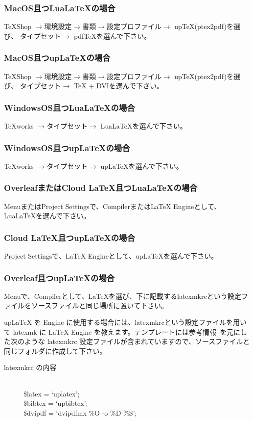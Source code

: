 \documentclass{PASJ2026}
\begin{document}
\subsubsection{MacOS且つLuaLaTeXの場合}
TeXShop $\rightarrow$環境設定$\rightarrow$書類$\rightarrow$設定プロファイル$\rightarrow$ upTeX(ptex2pdf)を選び、
タイプセット$\rightarrow$ pdfTeXを選んで下さい。
\subsubsection{MacOS且つupLaTeXの場合}
TeXShop $\rightarrow$環境設定$\rightarrow$書類$\rightarrow$設定プロファイル$\rightarrow$ upTeX(ptex2pdf)を選び、
タイプセット$\rightarrow$ TeX + DVIを選んで下さい。
\subsubsection{WindowsOS且つLuaLaTeXの場合}
TeXworks $\rightarrow$タイプセット$\rightarrow$ LuaLaTeXを選んで下さい。
\subsubsection{WindowsOS且つupLaTeXの場合}
TeXworks $\rightarrow$タイプセット$\rightarrow$ upLaTeXを選んで下さい。
%
\subsubsection{OverleafまたはCloud LaTeX且つLuaLaTeXの場合}
MenuまたはProject Settingsで、CompilerまたはLaTeX Engineとして、LuaLaTeXを選んで下さい。\\
%
\subsubsection{Cloud LaTeX且つupLaTeXの場合}
Project Settingsで、LaTeX Engineとして、upLaTeXを選んで下さい。
\subsubsection{Overleaf且つupLaTeXの場合}
Menuで、Compilerとして、LaTeXを選び、下に記載するlatexmkrcという設定ファイルをソースファイルと同じ場所に置いて下さい。

{up\LaTeX} を Engine に使用する場合には、latexmkrcという設定ファイルを用いて latexmk に LaTeX Engine を教えます。テンプレートには参考情報~\cite{Overleaf-uptex}を元にした次のような latexmkrc 設定ファイルが含まれていますので、ソースファイルと同じフォルダに作成して下さい。
\begin{description}
\item[latexmkrc の内容]{
\ \\
\$latex = `uplatex';\\
\$bibtex = `upbibtex';\\
\$dvipdf = `dvipdfmx \%O -o \%D \%S';\\
}
\end{description}
\end{document}
